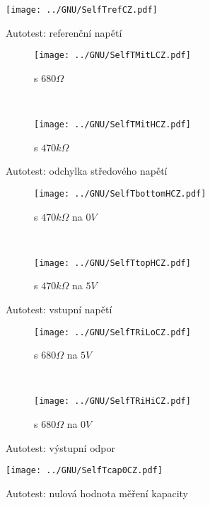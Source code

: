 \begin{figure}[H]
  \centering
  \texttt{[image: ../GNU/SelfTrefCZ.pdf]}
  \caption{Autotest: referenční napětí}
  \label{fig:SelfTref}
\end{figure}

\begin{figure}[H]
  \begin{subfigure}[b]{9cm}
    \centering
    \texttt{[image: ../GNU/SelfTMitLCZ.pdf]}
    \caption{s \(680 \Omega\)}
    \label{fig:SelfTMitL}
  \end{subfigure}
  ~
  \begin{subfigure}[b]{9cm}
    \centering
    \texttt{[image: ../GNU/SelfTMitHCZ.pdf]}
    \caption{s \(470 k\Omega\)}
    \label{fig:SelfTMitH}
  \end{subfigure}
  \caption{Autotest: odchylka středového napětí}
\end{figure}

\begin{figure}[H]
  \begin{subfigure}[b]{9cm}
  \centering
    \texttt{[image: ../GNU/SelfTbottomHCZ.pdf]}
    \caption{s \(470k\Omega\) na \(0V\)}
    \label{fig:SelfTlowH}
  \end{subfigure}
  ~
  \begin{subfigure}[b]{9cm}
  \centering
    \texttt{[image: ../GNU/SelfTtopHCZ.pdf]}
    \caption{s \(470k\Omega\) na \(5V\)}
    \label{fig:SelfTtopH}
  \end{subfigure}
  \caption{Autotest: vstupní napětí}
\end{figure}

\begin{figure}[H]
  \begin{subfigure}[b]{9cm}
  \centering
    \texttt{[image: ../GNU/SelfTRiLoCZ.pdf]}
    \caption{s \(680\Omega\) na \(5V\)}
    \label{fig:SelfTRoL}
  \end{subfigure}
  ~
  \begin{subfigure}[b]{9cm}
  \centering
    \texttt{[image: ../GNU/SelfTRiHiCZ.pdf]}
    \caption{s \(680\Omega\) na \(0V\)}
    \label{fig:SelfTRoH}
  \end{subfigure}
  \caption{Autotest: výstupní odpor}
\end{figure}

\begin{figure}[H]
  \centering
  \texttt{[image: ../GNU/SelfTcap0CZ.pdf]}
  \caption{Autotest: nulová hodnota měření kapacity}
  \label{fig:SelfTcap}
\end{figure}

